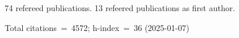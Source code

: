 74 refereed publications. 13 refeered publications as first author.

Total citations~=~4572; h-index~=~36 (2025-01-07)